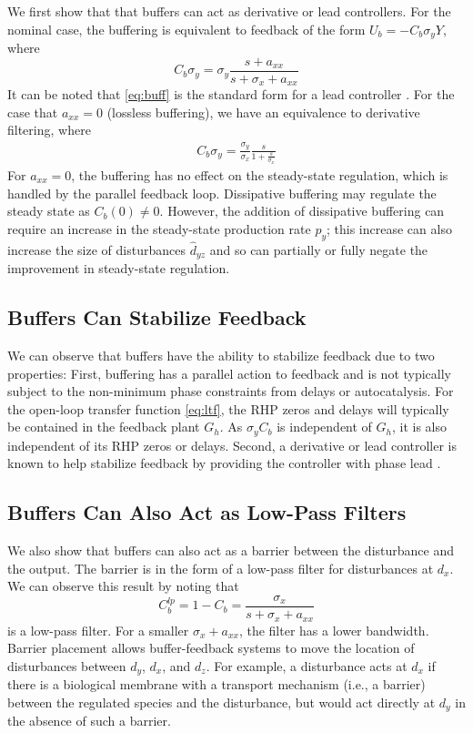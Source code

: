 \documentclass[letterpaper, 10 pt,  conference]{ieeeconf}  %
\begin{document}
We first show that that buffers can act as derivative or lead controllers. For the nominal case, the buffering is equivalent to feedback of the form $U_b=- C_b\sigma_yY$, where
\begin{equation}\label{eq:buff}
C_b\sigma_y=\sigma_y\frac{s+a_{xx}}{s+\sigma_x+a_{xx}}
\end{equation}
It can be noted that \eqref{eq:buff} is the standard form for a lead controller \cite{HANAPS17}. For the case that $a_{xx}=0$ (lossless buffering), we have an equivalence to derivative filtering, where
\begin{equation*}
\begin{aligned}
C_b\sigma_y= \frac{\sigma_y}{\sigma_x}\frac{s}{1+\frac{s}{\sigma_x}}
\end{aligned}
\end{equation*}
For $a_{xx}=0$, the buffering has no effect on the steady-state regulation, which is handled by the parallel feedback loop. Dissipative buffering may regulate the steady state as $C_b(0)\ne 0$. However, the addition of dissipative buffering can require an increase in the steady-state production rate $p_y$; this increase can also increase the size of disturbances $\hat{d}_{yz}$ and so can partially or fully negate the improvement in steady-state regulation.

\subsection{Buffers Can Stabilize Feedback}

We can observe that buffers have the ability to stabilize feedback due to two properties:  First, buffering has a parallel action to feedback and is not typically subject to the non-minimum phase constraints from delays or autocatalysis. For the open-loop transfer function \eqref{eq:ltf}, the RHP zeros and delays will typically be contained in the feedback plant $G_h$. As $\sigma_yC_b$ is independent of $ G_h$, it is also independent of its RHP zeros or delays. Second, a derivative or lead controller is known to help stabilize feedback by providing the controller with phase lead \cite{NIS04}.

\subsection{Buffers Can Also Act as Low-Pass Filters}

We also show that buffers can also act as a barrier between the disturbance and the output. The barrier is in the form of a low-pass filter for disturbances at $d_x$. We can observe this result by noting that
\begin{equation*}
C_b^{lp}=1-C_b=\frac{\sigma_x}{s+\sigma_x+a_{xx}}
\end{equation*}
is a low-pass filter.  For a smaller $\sigma_x+a_{xx}$, the filter has a lower bandwidth. Barrier placement allows buffer-feedback systems to move the location of disturbances between $d_y$, $d_x$, and $d_z$. For example, a disturbance acts at $d_x$ if there is a biological membrane with a transport mechanism (i.e., a barrier) between the regulated species and the disturbance, but would act directly at $d_y$ in the absence of such a barrier.
\end{document}
